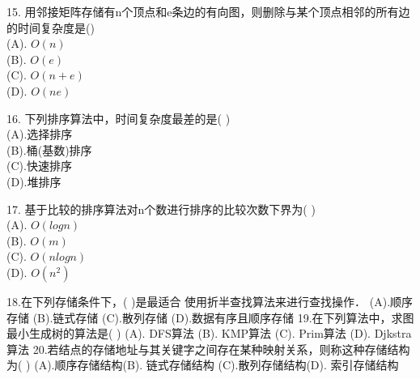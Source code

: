15. 用邻接矩阵存储有n个顶点和e条边的有向图，则删除与某个顶点相邻的所有边的时间复杂度是() \\
(A). $O(n)$ \\
(B). $O(e)$ \\
(C). $O(n+e)$ \\
(D). $O(ne)$

16. 下列排序算法中，时间复杂度最差的是( ) \\
(A).选择排序 \\
(B).桶(基数)排序 \\
(C).快速排序 \\
(D).堆排序

17. 基于比较的排序算法对n个数进行排序的比较次数下界为( ) \\
(A). $O(logn)$ \\
(B). $O(m)$  \\
(C). $O(nlogn)$ \\
(D). $O(n^2)$

18.在下列存储条件下，( )是最适合 使用折半查找算法来进行查找操作．
(A).顺序存储
(B).链式存储
(C).散列存储
(D).数据有序且顺序存储
19.在下列算法中，求图最小生成树的算法是( )
(A). DFS算法
(B). KMP算法
(C). Prim算法
(D). Djkstra算法
20.若结点的存储地址与其关键字之间存在某种映射关系，则称这种存储结构为( )
(A).顺序存储结构(B). 链式存储结构
(C).散列存储结构(D). 索引存储结构
